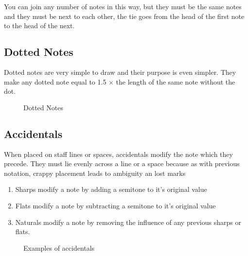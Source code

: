 You can join any number of notes in this way, but they must be the same notes and they must be next to each other, the tie goes from the head of the first note to the head of the next.

\subsection*{Dotted Notes}

Dotted notes are very simple to draw and their purpose is even simpler. They make any dotted note equal to 1.5 $\times$ the length of the same note without the dot.

\begin{figure}[h!]
  \centering
  \caption{Dotted Notes}
  \label{fig:DottedNotes}
\end{figure}

\subsection*{Accidentals}

When placed on staff lines or spaces, accidentals modify the note which they precede. They must lie evenly across a line or a space because as with previous notation, crappy placement leads to ambiguity an lost marks

\begin{enumerate}
\item Sharps modify a note by adding a semitone to it's original value
\item Flats modify a note by subtracting a semitone to it's original value
\item Naturals modify a note by removing the influence of any previous sharps or flats.
\end{enumerate}

\begin{figure}[h!]
  \centering
  \caption{Examples of accidentals}
  \label{fig:BassClef}
\end{figure}
